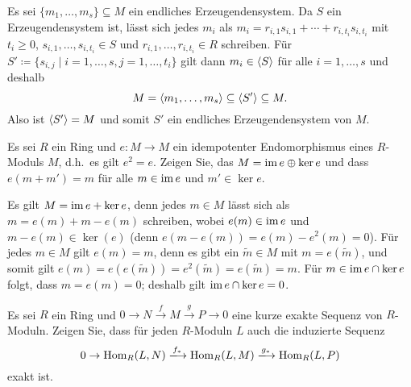 \begin{solution}
  Es sei $\{m_1, \dotsc, m_s\} \subseteq M$ ein endliches Erzeugendensystem.
  Da $S$ ein Erzeugendensystem ist, lässt sich jedes $m_i$ als $m_i = r_{i,1} s_{i,1} + \dotsb + r_{i,t_i} s_{i,t_i}$ mit $t_i \geq 0$, $s_{i,1}, \dotsc, s_{i,t_i} \in S$ und $r_{i,1}, \dotsc, r_{i,t_i} \in R$ schreiben.
  Für $S' \coloneqq \{s_{i,j} \mid i = 1, \dotsc, s, j = 1, \dotsc, t_i\}$ gilt dann $m_i \in \left\langle S \right\rangle$ für alle $i = 1, \dotsc, s$ und deshalb
  \[
              M
    =         \left\langle m_1, \dotsc, m_s \right\rangle
    \subseteq \left\langle S' \right\rangle
    \subseteq M.
  \]
  Also ist $\left\langle S' \right\rangle = M$ und somit $S'$ ein endliches Erzeugendensystem von $M$.
\end{solution}


\begin{question}[subtitle = Idempotente]
  Es sei $R$ ein Ring und $e \colon M \to M$ ein idempotenter Endomorphismus eines $R$-Moduls $M$, d.h.\ es gilt $e^2 = e$.
  Zeigen Sie, das $M = \operatorname{im} e \oplus \ker e$ und dass $e(m + m') = m$ für alle $m \in \operatorname{im} e$ und $m' \in \ker e$.
\end{question}


\begin{solution}
  Es gilt $M = \operatorname{im} e + \ker e$, denn jedes $m \in M$ lässt sich als $m = e(m) + m - e(m)$ schreiben, wobei $e(m) \in \operatorname{im} e$ und $m - e(m) \in \ker(e)$ (denn $e(m - e(m)) = e(m) - e^2(m) = 0$).
  Für jedes $m \in M$ gilt $e(m) = m$, denn es gibt ein $\tilde{m} \in M$ mit $m = e(\tilde{m})$, und somit gilt $e(m) = e(e(\tilde{m})) = e^2(\tilde{m}) = e(\tilde{m}) = m$.
  Für $m \in \operatorname{im} e \cap \ker e$ folgt, dass $m = e(m) = 0$;
  deshalb gilt $\operatorname{im} e \cap \ker e = 0$.
\end{solution}


\begin{question}[subtitle = Linksexaktheit von $\Hom$]
  \label{question: Hom is left exact}
  Es sei $R$ ein Ring und $0 \to N \xrightarrow{f} M \xrightarrow{g} P \to 0$ eine kurze exakte Sequenz von $R$-Moduln.
  Zeigen Sie, dass für jeden $R$-Moduln $L$ auch die induzierte Sequenz
  \[
                          0
    \to                   \Hom_R(L,N)
    \xlongrightarrow{f_*} \Hom_R(L,M)
    \xlongrightarrow{g_*} \Hom_R(L,P)
  \]
  exakt ist.
\end{question}


